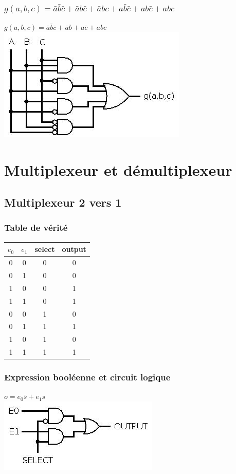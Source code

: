 \documentclass[10pt,a4paper]{article}
\begin{document}
\subsubsection{$g(a,b,c) = \bar{a}\bar{b}\bar{c} + \bar{a}b\bar{c} + \bar{a}bc + a\bar{b}\bar{c} + ab\bar{c} + abc$}
$g(a,b,c) = \bar{a}\bar{b}\bar{c} + \bar{a}b+ a\bar{c} + abc$\\
\includegraphics[scale=0.5]{Question7g.jpg} 

\section{Multiplexeur et démultiplexeur}
\subsection{Multiplexeur 2 vers 1}
\subsubsection{Table de vérité}
\begin{tabular}{ccc|c}
$e_{0}$ & $e_{1}$ & select & output \\ 
\hline 
0 & 0 & 0 & 0\\ 
0 & 1 & 0 & 0\\ 
1 & 0 & 0 & 1\\ 
1 & 1 & 0 & 1\\ 
0 & 0 & 1 & 0\\ 
0 & 1 & 1 & 1\\ 
1 & 0 & 1 & 0\\ 
1 & 1 & 1 & 1\\ 
\end{tabular} 

\subsubsection{Expression booléenne et circuit logique}
$o = e_{0}\bar{s} + e_{1}s$\\
\includegraphics[scale=0.5]{mult2vers1.jpg} 
\end{document}
